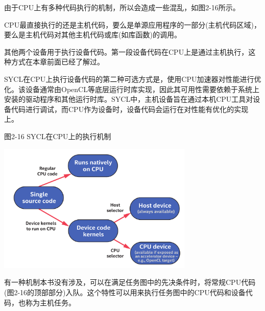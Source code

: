 
由于CPU上有多种代码执行的机制，所以会造成一些混乱，如图2-16所示。\par

CPU最直接执行的还是主机代码，要么是单源应用程序的一部分(主机代码区域)，要么是主机代码对其他主机代码或库(如库函数)的调用。\par

其他两个设备用于执行设备代码。第一段设备代码在CPU上是通过主机执行，这种方式在本章前面已经了解过。\par

SYCL在CPU上执行设备代码的第二种可选方式是，使用CPU加速器对性能进行优化。该设备通常由OpenCL等底层运行时库实现，因此其可用性需要依赖于系统上安装的驱动程序和其他运行时库。SYCL中，主机设备旨在通过本机CPU工具对设备代码进行调试，而CPU作为设备时，设备代码会运行在对性能有优化的实现上。\par

\hspace*{\fill} \par %
图2-16 SYCL在CPU上的执行机制
\begin{center}
	\includegraphics[width=0.7\textwidth]{content/chapter-2/images/9}
\end{center}

有一种机制本书没有涉及，可以在满足任务图中的先决条件时，将常规CPU代码(图2-16的顶部部分)入队。这个特性可以用来执行任务图中的CPU代码和设备代码，也称为主机任务。\par








